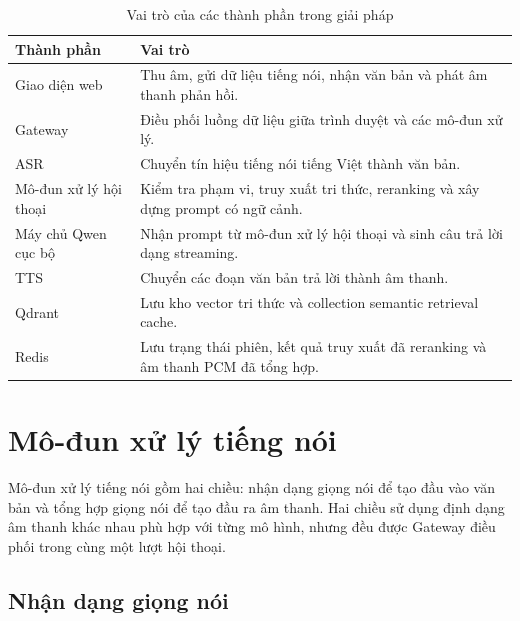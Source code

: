 \documentclass[a4paper,13pt,oneside]{report}
\begin{document}
\begin{table}[H]
    \centering
    \caption{Vai trò của các thành phần trong giải pháp}
    \begin{tabular}{|p{3.2cm}|p{10cm}|}
        \hline
        \textbf{Thành phần}    & \textbf{Vai trò}                                                       \\
        \hline
        Giao diện web          & Thu âm, gửi dữ liệu tiếng nói, nhận văn bản và phát âm thanh phản hồi. \\
        \hline
        Gateway                & Điều phối luồng dữ liệu giữa trình duyệt và các mô-đun xử lý.          \\
        \hline
        ASR                    & Chuyển tín hiệu tiếng nói tiếng Việt thành văn bản.                    \\
        \hline
        Mô-đun xử lý hội thoại & Kiểm tra phạm vi, truy xuất tri thức, reranking và xây dựng prompt có ngữ cảnh. \\
        \hline
        Máy chủ Qwen cục bộ    & Nhận prompt từ mô-đun xử lý hội thoại và sinh câu trả lời dạng streaming. \\
        \hline
        TTS                    & Chuyển các đoạn văn bản trả lời thành âm thanh.                        \\
        \hline
        Qdrant                 & Lưu kho vector tri thức và collection semantic retrieval cache.        \\
        \hline
        Redis                  & Lưu trạng thái phiên, kết quả truy xuất đã reranking và âm thanh PCM đã tổng hợp. \\
        \hline
    \end{tabular}
\end{table}

\section{Mô-đun xử lý tiếng nói}

Mô-đun xử lý tiếng nói gồm hai chiều: nhận dạng giọng nói để tạo đầu vào văn bản và tổng hợp giọng nói để tạo đầu ra âm thanh. Hai chiều sử dụng định dạng âm thanh khác nhau phù hợp với từng mô hình, nhưng đều được Gateway điều phối trong cùng một lượt hội thoại.

\subsection{Nhận dạng giọng nói}
\end{document}
